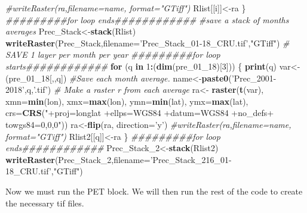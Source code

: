 \documentclass[
  10pt,
  b5paper,
]{book}
\newenvironment{Shaded}{\begin{snugshade}}{\end{snugshade}}
\newcommand{\CommentTok}[1]{\textcolor[rgb]{0.56,0.35,0.01}{\textit{#1}}}
\newcommand{\ControlFlowTok}[1]{\textcolor[rgb]{0.13,0.29,0.53}{\textbf{#1}}}
\newcommand{\DataTypeTok}[1]{\textcolor[rgb]{0.13,0.29,0.53}{#1}}
\newcommand{\DecValTok}[1]{\textcolor[rgb]{0.00,0.00,0.81}{#1}}
\newcommand{\KeywordTok}[1]{\textcolor[rgb]{0.13,0.29,0.53}{\textbf{#1}}}
\newcommand{\NormalTok}[1]{#1}
\newcommand{\OperatorTok}[1]{\textcolor[rgb]{0.81,0.36,0.00}{\textbf{#1}}}
\newcommand{\StringTok}[1]{\textcolor[rgb]{0.31,0.60,0.02}{#1}}
\begin{document}
\begin{Shaded}
\begin{Highlighting}[]
\CommentTok{#writeRaster(ra,filename=name, format="GTiff")}
\NormalTok{Rlist[[i]]<-ra}
\NormalTok{\}}
\CommentTok{#########for loop ends############}
 \CommentTok{#save a stack of months averages}
\NormalTok{ Prec_Stack<-}\KeywordTok{stack}\NormalTok{(Rlist)}
\KeywordTok{writeRaster}\NormalTok{(Prec_Stack,}\DataTypeTok{filename=}\StringTok{'Prec_Stack_01-18_CRU.tif'}\NormalTok{,}\StringTok{"GTiff"}\NormalTok{)}
 \CommentTok{# SAVE 1 layer per month per year}
\CommentTok{#########for loop starts############}
 \ControlFlowTok{for}\NormalTok{ (q }\ControlFlowTok{in} \DecValTok{1}\OperatorTok{:}\NormalTok{(}\KeywordTok{dim}\NormalTok{(pre_}\DecValTok{01}\NormalTok{_}\DecValTok{18}\NormalTok{)[}\DecValTok{3}\NormalTok{])) \{}
\KeywordTok{print}\NormalTok{(q)}
\NormalTok{var<-(pre_}\DecValTok{01}\NormalTok{_}\DecValTok{18}\NormalTok{[,,q])}
 \CommentTok{#Save each month average. }
\NormalTok{ name<-}\KeywordTok{paste0}\NormalTok{(}\StringTok{'Prec_2001-2018'}\NormalTok{,q,}\StringTok{'.tif'}\NormalTok{)}
 \CommentTok{# Make a raster r from each average}
\NormalTok{ra<-}\StringTok{ }\KeywordTok{raster}\NormalTok{(}\KeywordTok{t}\NormalTok{(var), }\DataTypeTok{xmn=}\KeywordTok{min}\NormalTok{(lon), }\DataTypeTok{xmx=}\KeywordTok{max}\NormalTok{(lon), }\DataTypeTok{ymn=}\KeywordTok{min}\NormalTok{(lat), }\DataTypeTok{ymx=}\KeywordTok{max}\NormalTok{(lat), }\DataTypeTok{crs=}\KeywordTok{CRS}\NormalTok{(}\StringTok{"+proj=longlat +ellps=WGS84 +datum=WGS84 +no_defs+ towgs84=0,0,0"}\NormalTok{))}
\NormalTok{ra<-}\KeywordTok{flip}\NormalTok{(ra, }\DataTypeTok{direction=}\StringTok{'y'}\NormalTok{)}
\CommentTok{#writeRaster(ra,filename=name, format="GTiff")}
\NormalTok{Rlist2[[q]]<-ra}
\NormalTok{\}}
\CommentTok{#########for loop ends############}
\NormalTok{Prec_Stack_}\DecValTok{2}\NormalTok{<-}\KeywordTok{stack}\NormalTok{(Rlist2)}
\KeywordTok{writeRaster}\NormalTok{(Prec_Stack_}\DecValTok{2}\NormalTok{,}\DataTypeTok{filename=}\StringTok{'Prec_Stack_216_01-18_CRU.tif'}\NormalTok{,}\StringTok{"GTiff"}\NormalTok{) }
\end{Highlighting}
\end{Shaded}

Now we must run the PET block. We will then run the rest of the code to create the necessary tif files.
\end{document}
